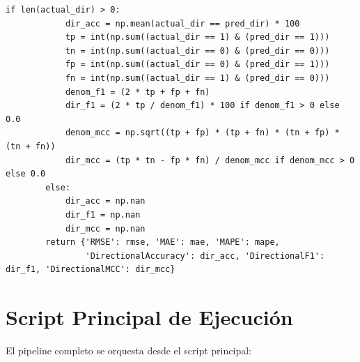 \begin{lstlisting}[frame=single, caption={Validador walk-forward}]
        if len(actual_dir) > 0:
            dir_acc = np.mean(actual_dir == pred_dir) * 100
            tp = int(np.sum((actual_dir == 1) & (pred_dir == 1)))
            tn = int(np.sum((actual_dir == 0) & (pred_dir == 0)))
            fp = int(np.sum((actual_dir == 0) & (pred_dir == 1)))
            fn = int(np.sum((actual_dir == 1) & (pred_dir == 0)))
            denom_f1 = (2 * tp + fp + fn)
            dir_f1 = (2 * tp / denom_f1) * 100 if denom_f1 > 0 else 0.0
            denom_mcc = np.sqrt((tp + fp) * (tp + fn) * (tn + fp) * (tn + fn))
            dir_mcc = (tp * tn - fp * fn) / denom_mcc if denom_mcc > 0 else 0.0
        else:
            dir_acc = np.nan
            dir_f1 = np.nan
            dir_mcc = np.nan
        return {'RMSE': rmse, 'MAE': mae, 'MAPE': mape,
                'DirectionalAccuracy': dir_acc, 'DirectionalF1': dir_f1, 'DirectionalMCC': dir_mcc}
\end{lstlisting}

\section{Script Principal de Ejecución}

El pipeline completo se orquesta desde el script principal:

